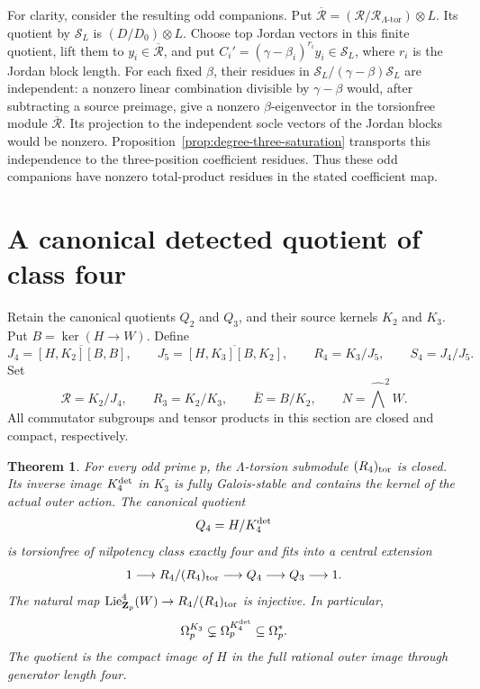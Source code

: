 \documentclass[11pt]{article}
\newtheorem{theorem}{Theorem}[section]
\theoremstyle{definition}\newtheorem{definition}[theorem]{Definition}
\begin{document}
For clarity, consider the resulting odd companions.
Put $\overline{\mathcal R}=
(\mathcal R/\mathcal R_{\Lambda\text{-tor}})\otimes L$.
Its quotient by $\mathcal S_L$ is $(D/D_0)\otimes L$.
Choose top Jordan vectors in this finite quotient,
lift them to $y_i\in\overline{\mathcal R}$, and put
$C_i'=(\gamma-\beta_i)^{r_i}y_i\in\mathcal S_L$,
where $r_i$ is the Jordan block length.
For each fixed $\beta$, their residues in
$\mathcal S_L/(\gamma-\beta)\mathcal S_L$ are independent:
a nonzero linear combination divisible by $\gamma-\beta$
would, after subtracting a source preimage, give a nonzero
$\beta$-eigenvector in the torsionfree module
$\overline{\mathcal R}$. Its projection to the independent
socle vectors of the Jordan blocks would be nonzero.
Proposition~\ref{prop:degree-three-saturation} transports
this independence to the three-position coefficient
residues. Thus these odd companions have nonzero
total-product residues in the stated coefficient map.

\section{A canonical detected quotient of class four}
\label{sec:canonical-class-four}

Retain the canonical quotients $Q_2$ and $Q_3$, and their
source kernels $K_2$ and $K_3$. Put $B=\ker(H\to W)$.
Define
\[
 J_4=\overline{[H,K_2][B,B]},\qquad
 J_5=\overline{[H,K_3][B,K_2]},\qquad
 R_4=K_3/J_5,\qquad S_4=J_4/J_5.
\]
Set
\[
 \mathcal R=K_2/J_4,\qquad R_3=K_2/K_3,\qquad
 \bar E=B/K_2,\qquad N=\widehat\bigwedge^2W.
\]
All commutator subgroups and tensor products in this
section are closed and compact, respectively.



\begin{theorem}\label{thm:canonical-class-four}
For every odd prime $p$, the $\Lambda$-torsion submodule
$(R_4)_{\rm tor}$ is closed. Its inverse image
$K_4^{\rm det}$ in $K_3$ is fully Galois-stable and
contains the kernel of the actual outer action. The
canonical quotient
\[
                         Q_4=H/K_4^{\rm det}
\]
is torsionfree of nilpotency class exactly four and
fits into a central extension
\[
 1\longrightarrow R_4/(R_4)_{\rm tor}
 \longrightarrow Q_4\longrightarrow Q_3\longrightarrow1.
\]
The natural map $\operatorname{Lie}^4_{\mathbf Z_p}(W)
\to R_4/(R_4)_{\rm tor}$ is injective. In particular,
\[
 \Omega_p^{K_3}\subsetneq\Omega_p^{K_4^{\rm det}}
                              \subseteq\Omega_p^*.
\]
The quotient is the compact image of $H$ in the full
rational outer image through generator length four.
\end{theorem}
\end{document}
